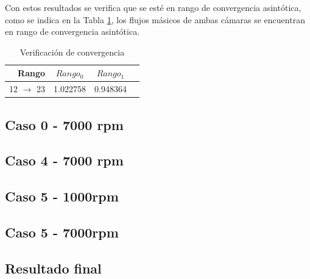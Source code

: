 \documentclass[11pt]{article}
\begin{document}
Con estos resultados se verifica que se esté en rango de convergencia
asintótica, como se indica en la Tabla \ref{tab:rac_caso_0}, los flujos
másicos de ambas cámaras se encuentran en rango de convergencia asintótica.

\begin{table}
    \centering
    \begin{tabular}{rccc}\toprule
        Rango               & $Rango_0$ & $Rango_1$ \\ \midrule
        12 $\rightarrow$ 23 & 1.022758  & 0.948364  \\ \bottomrule
    \end{tabular}
    \caption{Verificación de convergencia}
    \label{tab:rac_caso_0}
\end{table}


\subsection{Caso 0 - 7000 rpm}

\subsection{Caso 4 - 7000 rpm}

\subsection{Caso 5 - 1000rpm}

\subsection{Caso 5 - 7000rpm}

\subsection{Resultado final}
\end{document}
